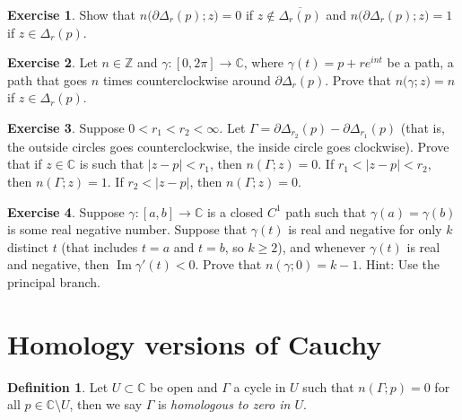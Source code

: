 \documentclass[12pt,openany]{book}
\renewcommand{\Im}{\operatorname{Im}}
\newcommand{\sabs}[1]{\lvert {#1} \rvert}
\newcommand{\C}{{\mathbb{C}}}
\newcommand{\Z}{{\mathbb{Z}}}
\newcommand{\myindex}[1]{#1\index{#1}}
\theoremstyle{plain}
\theoremstyle{remark}
\theoremstyle{definition}
\newtheorem{defn}[thm]{Definition}
\newenvironment{exbox}{%
    \def\FrameCommand{\vrule width 1pt \relax\hspace{10pt}}%
    \MakeFramed{\advance\hsize-\width\FrameRestore}%
}{%
    \endMakeFramed
}
\theoremstyle{exercise}
\newtheorem{exercise}{Exercise}[section]
\theoremstyle{example}
\begin{document}
\begin{exbox}
\begin{exercise}%
\label{exercise:windingcircle}
Show that $n\bigl(\partial \Delta_r(p);z\bigr) = 0$ if $z \notin
\overline{\Delta_r(p)}$ and 
$n\bigl(\partial \Delta_r(p);z\bigr) = 1$ if $z \in \Delta_r(p)$.
\end{exercise}

\begin{exercise}
Let $n \in \Z$ and $\gamma \colon [0,2\pi] \to \C$, where
$\gamma(t) = p + re^{in t}$ be a path, a path that goes $n$ times
counterclockwise around $\partial \Delta_r(p)$.
Prove that
$n\bigl(\gamma;z\bigr) = n$ if $z \in \Delta_r(p)$.
\end{exercise}

\begin{exercise}%
\label{exercise:windingcircles}
Suppose $0 < r_1 < r_2 < \infty$.
Let $\Gamma = \partial \Delta_{r_2}(p) - \partial \Delta_{r_1} (p)$
(that is, the outside circles goes counterclockwise, the inside circle goes
clockwise).
Prove that if $z \in \C$ is such that $\sabs{z-p} < r_1$, then
$n(\Gamma;z) = 0$.  If $r_1 < \sabs{z-p} < r_2$, then
$n(\Gamma;z) = 1$.  If $r_2 < \sabs{z-p}$, then
$n(\Gamma;z) = 0$.
\end{exercise}

\begin{exercise}%
\label{exercise:rayktimes}
Suppose $\gamma \colon [a,b] \to \C$ is a closed $C^1$ path such that
$\gamma(a) = \gamma(b)$ is some real negative number.  Suppose
that $\gamma(t)$ is real and negative for only $k$ distinct $t$ (that
includes $t=a$ and $t=b$, so $k \geq 2$), and whenever $\gamma(t)$ is real and negative,
then $\Im \gamma'(t) < 0$.  Prove that $n(\gamma;0) = k-1$.  Hint: Use
the principal branch.
\end{exercise}
\end{exbox}



\section{Homology versions of Cauchy}

\begin{defn}
Let $U \subset \C$ be open and $\Gamma$
a cycle
in $U$
such that $n(\Gamma;p) = 0$ for all $p \in \C \setminus U$,
 then we
say $\Gamma$ is \emph{\myindex{homologous to zero} in $U$}.
\end{defn}
\end{document}
